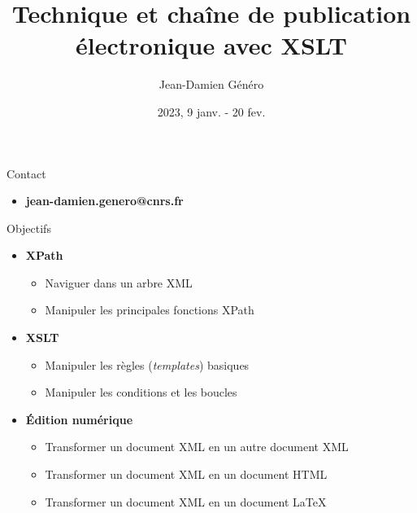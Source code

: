 \documentclass{beamer}
\title{Technique et chaîne de publication électronique avec XSLT}
\date{2023, 9 janv. - 20 fev.}
\author{Jean-Damien Généro}
\institute{École nationale des chartes -- M2 TNAH}
\begin{document}
  \maketitle
  
  \begin{frame}{Contact}
  \Large
      \begin{itemize}
          \item \textbf{jean-damien.genero@cnrs.fr}
      \end{itemize}
  \end{frame}


    \begin{frame}{Objectifs}
  \Large
      \begin{itemize}
          \item \textbf{XPath}
          \begin{itemize}
              \item Naviguer dans un arbre XML
              \item Manipuler les principales fonctions XPath
          \end{itemize}
          \item \textbf{XSLT}
          \begin{itemize}
              \item Manipuler les règles (\textit{templates}) basiques
              \item Manipuler les conditions et les boucles
          \end{itemize}
          \item \textbf{Édition numérique}
          \begin{itemize}
              \item Transformer un document XML en un autre document XML
              \item Transformer un document XML en un document HTML
              \item Transformer un document XML en un document \LaTeX
          \end{itemize}
      \end{itemize}
  \end{frame}
   
\end{document}
